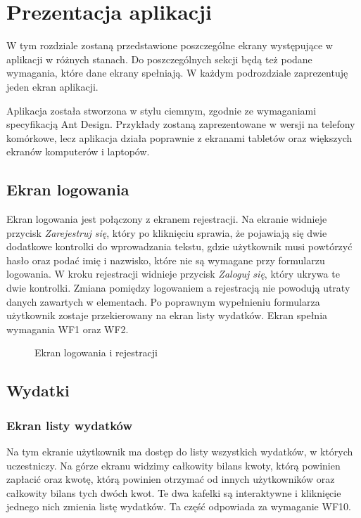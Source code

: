 \newpage
\section{Prezentacja aplikacji}
W tym rozdziale zostaną przedstawione poszczególne ekrany występujące w aplikacji w różnych stanach. Do poszczególnych sekcji będą też podane wymagania, które dane ekrany spełniają. W każdym podrozdziale zaprezentuję jeden ekran aplikacji.


Aplikacja została stworzona w stylu ciemnym, zgodnie ze wymaganiami specyfikacją Ant Design. Przykłady zostaną zaprezentowane w wersji na telefony komórkowe, lecz aplikacja działa poprawnie z ekranami tabletów oraz większych ekranów komputerów i laptopów.

\clearpage
\subsection{Ekran logowania}
Ekran logowania jest połączony z ekranem rejestracji. Na ekranie widnieje przycisk \emph{Zarejestruj się}, który po kliknięciu sprawia, że pojawiają się dwie dodatkowe kontrolki do wprowadzania tekstu, gdzie użytkownik musi powtórzyć hasło oraz podać imię i nazwisko, które nie są wymagane przy formularzu logowania. W kroku rejestracji widnieje przycisk \emph{Zaloguj się}, który ukrywa te dwie kontrolki. Zmiana pomiędzy logowaniem a rejestracją nie powodują utraty danych zawartych w elementach. Po poprawnym wypełnieniu formularza użytkownik zostaje przekierowany na ekran listy wydatków. Ekran spełnia wymagania WF1 oraz WF2.


\begin{figure}[h!]%
    \centering
    \qquad
    \caption{Ekran logowania i rejestracji}%
\end{figure}

\clearpage
\subsection{Wydatki}
\subsubsection{Ekran listy wydatków}
Na tym ekranie użytkownik ma dostęp do listy wszystkich wydatków, w których uczestniczy. Na górze ekranu widzimy całkowity bilans kwoty, którą powinien zapłacić oraz kwotę, którą powinien otrzymać od innych użytkowników oraz całkowity bilans tych dwóch kwot. Te dwa kafelki są interaktywne i kliknięcie jednego nich zmienia listę wydatków. Ta część odpowiada za wymaganie WF10.

